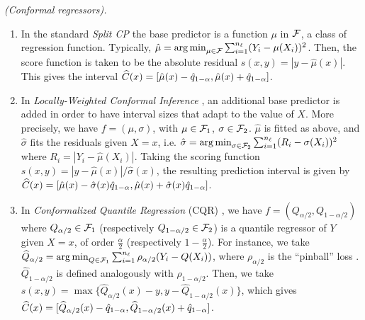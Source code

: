 \begin{exemple}\emph{(Conformal regressors).}
    \label{exemple:base-predictor}
    \begin{enumerate}%
        \item In the standard \emph{Split CP} \citep{papadopoulos2002inductive} the base predictor is a function $\mu$ in $\mathcal{F}$, a class of regression function. Typically, $\hat{\mu} = \operatorname*{arg\,min}_{\mu\in \mathcal{F}}\sum_{i=1}^{n_\ell}(Y_i - \mu(X_i))^2$. Then, the score function is taken to be the absolute residual $s(x, y) = |y-\hat{\mu}(x)|$. This gives the interval ${\widehat{C}}(x)=[\hat{\mu}(x)-\hat{q}_{1-\alpha}, \hat{\mu}(x)+\hat{q}_{1-\alpha}]$.
        \item In \emph{Locally-Weighted Conformal Inference} \citep{papadopoulos2008normalized}, an additional base predictor is added in order to have interval sizes that adapt to the value of $X$. More precisely, we have $f=(\mu,\sigma)$, with $\mu \in \mathcal{F}_1$, $\sigma \in \mathcal{F}_2$. $\hat{\mu}$ is fitted as above, and $\hat{\sigma}$ fits the residuals given $X=x$, i.e. $\hat{\sigma} = \operatorname*{arg\,min}_{\sigma \in \mathcal{F}_2} \sum_{i=1}^{n_\ell}(R_i - \sigma(X_i))^2$ where $R_i=|Y_i-\hat{\mu}(X_i)|$. Taking the scoring function $s(x, y) = |y-\hat{\mu}(x)|/\hat{\sigma}(x)$, the resulting prediction interval is given by ${\widehat{C}}(x)=[\hat{\mu}(x)-\hat{\sigma}(x)\hat{q}_{1-\alpha}, \hat{\mu}(x)+\hat{\sigma}(x)\hat{q}_{1-\alpha}]$.
        \item In \emph{Conformalized Quantile Regression} (CQR) \citep{romano2019conformalized}, we have $f=(Q_{\alpha/2},Q_{1-\alpha/2})$ where $Q_{\alpha/2} \in \mathcal{F}_1$ (respectively $Q_{1-\alpha/2}\in \mathcal{F}_2$) is a quantile regressor of $Y$ given $X=x$, of order $\frac{\alpha}{2}$ (respectively $1-\frac{\alpha}{2}$). For instance, we take $\widehat{Q}_{\alpha/2} = \operatorname*{arg\,min}_{Q\in\mathcal{F}_1}\sum_{i=1}^{n_\ell}\rho_{\alpha/2}(Y_i-Q(X_i))$, where $\rho_{\alpha/2}$ is the ``pinball'' loss \citep{koenker2001quantile}. $\widehat{Q}_{1-\alpha/2}$ is defined analogously with $\rho_{1-\alpha/2}$. Then, we take $s(x,y) = \max\{\widehat{Q}_{\alpha/2}(x) - y, y- \widehat{Q}_{1-\alpha/2}(x)\}$, which gives ${\widehat{C}}(x)=[\widehat{Q}_{\alpha/2}(x) - \hat{q}_{1-\alpha}, \widehat{Q}_{1-\alpha/2}(x) + \hat{q}_{1-\alpha}]$.
    \end{enumerate}
\end{exemple}


